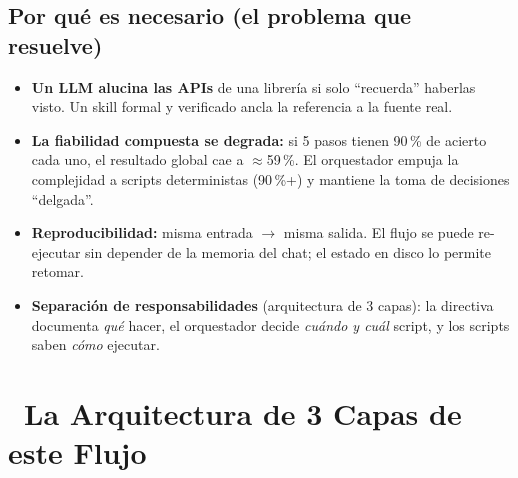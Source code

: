 \documentclass[11pt,a4paper]{article}
\newcommand{\iconotexto}[2]{\textcolor{cyanNeon}{\faIcon{#1}}~#2}
\begin{document}
\subsection{Por qué es necesario (el problema que resuelve)}
\begin{itemize}[leftmargin=*]
  \item \textbf{Un LLM alucina las APIs} de una librería si solo ``recuerda'' haberlas visto.
    Un skill formal y verificado ancla la referencia a la fuente real.
  \item \textbf{La fiabilidad compuesta se degrada:} si 5 pasos tienen 90\,\% de acierto cada
    uno, el resultado global cae a $\approx$59\,\%. El orquestador empuja la complejidad a
    scripts deterministas ({}90\,\%+) y mantiene la toma de decisiones ``delgada''.
  \item \textbf{Reproducibilidad:} misma entrada $\to$ misma salida. El flujo se puede
    re-ejecutar sin depender de la memoria del chat; el estado en disco lo permite retomar.
  \item \textbf{Separación de responsabilidades} (arquitectura de 3 capas): la directiva
    documenta \emph{qué} hacer, el orquestador decide \emph{cuándo y cuál} script, y los
    scripts saben \emph{cómo} ejecutar.
\end{itemize}

\section{\iconotexto{layer-group}{La Arquitectura de 3 Capas de este Flujo}}
\end{document}
